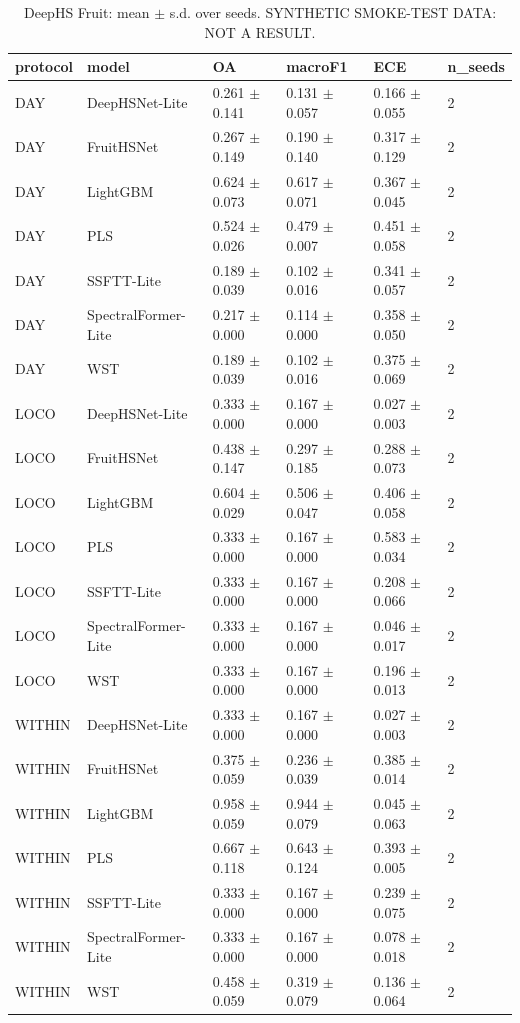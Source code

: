 \begin{table}[t]
\centering
\caption{DeepHS Fruit: mean $\pm$ s.d. over seeds. SYNTHETIC SMOKE-TEST DATA: NOT A RESULT.}
\label{tab:table_deephs_main}
\begin{tabular}{llllll}
\hline
protocol & model & OA & macroF1 & ECE & n\_seeds \\
\hline
DAY & DeepHSNet-Lite & 0.261 $\pm$ 0.141 & 0.131 $\pm$ 0.057 & 0.166 $\pm$ 0.055 & 2 \\
DAY & FruitHSNet & 0.267 $\pm$ 0.149 & 0.190 $\pm$ 0.140 & 0.317 $\pm$ 0.129 & 2 \\
DAY & LightGBM & 0.624 $\pm$ 0.073 & 0.617 $\pm$ 0.071 & 0.367 $\pm$ 0.045 & 2 \\
DAY & PLS & 0.524 $\pm$ 0.026 & 0.479 $\pm$ 0.007 & 0.451 $\pm$ 0.058 & 2 \\
DAY & SSFTT-Lite & 0.189 $\pm$ 0.039 & 0.102 $\pm$ 0.016 & 0.341 $\pm$ 0.057 & 2 \\
DAY & SpectralFormer-Lite & 0.217 $\pm$ 0.000 & 0.114 $\pm$ 0.000 & 0.358 $\pm$ 0.050 & 2 \\
DAY & WST & 0.189 $\pm$ 0.039 & 0.102 $\pm$ 0.016 & 0.375 $\pm$ 0.069 & 2 \\
LOCO & DeepHSNet-Lite & 0.333 $\pm$ 0.000 & 0.167 $\pm$ 0.000 & 0.027 $\pm$ 0.003 & 2 \\
LOCO & FruitHSNet & 0.438 $\pm$ 0.147 & 0.297 $\pm$ 0.185 & 0.288 $\pm$ 0.073 & 2 \\
LOCO & LightGBM & 0.604 $\pm$ 0.029 & 0.506 $\pm$ 0.047 & 0.406 $\pm$ 0.058 & 2 \\
LOCO & PLS & 0.333 $\pm$ 0.000 & 0.167 $\pm$ 0.000 & 0.583 $\pm$ 0.034 & 2 \\
LOCO & SSFTT-Lite & 0.333 $\pm$ 0.000 & 0.167 $\pm$ 0.000 & 0.208 $\pm$ 0.066 & 2 \\
LOCO & SpectralFormer-Lite & 0.333 $\pm$ 0.000 & 0.167 $\pm$ 0.000 & 0.046 $\pm$ 0.017 & 2 \\
LOCO & WST & 0.333 $\pm$ 0.000 & 0.167 $\pm$ 0.000 & 0.196 $\pm$ 0.013 & 2 \\
WITHIN & DeepHSNet-Lite & 0.333 $\pm$ 0.000 & 0.167 $\pm$ 0.000 & 0.027 $\pm$ 0.003 & 2 \\
WITHIN & FruitHSNet & 0.375 $\pm$ 0.059 & 0.236 $\pm$ 0.039 & 0.385 $\pm$ 0.014 & 2 \\
WITHIN & LightGBM & 0.958 $\pm$ 0.059 & 0.944 $\pm$ 0.079 & 0.045 $\pm$ 0.063 & 2 \\
WITHIN & PLS & 0.667 $\pm$ 0.118 & 0.643 $\pm$ 0.124 & 0.393 $\pm$ 0.005 & 2 \\
WITHIN & SSFTT-Lite & 0.333 $\pm$ 0.000 & 0.167 $\pm$ 0.000 & 0.239 $\pm$ 0.075 & 2 \\
WITHIN & SpectralFormer-Lite & 0.333 $\pm$ 0.000 & 0.167 $\pm$ 0.000 & 0.078 $\pm$ 0.018 & 2 \\
WITHIN & WST & 0.458 $\pm$ 0.059 & 0.319 $\pm$ 0.079 & 0.136 $\pm$ 0.064 & 2 \\
\hline
\end{tabular}
\end{table}